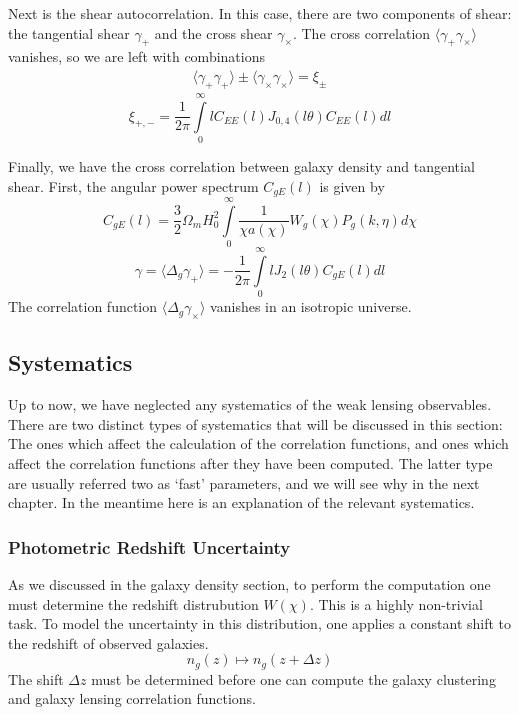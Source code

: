 Next is the shear autocorrelation. In this case, there are two components of shear: the tangential shear $\gamma_+$ and the cross shear $\gamma_\times$. The cross correlation $\langle \gamma_+ \gamma_\times \rangle$ vanishes, so we are left with combinations
\begin{equation}
	\begin{split}
		\langle \gamma_+\gamma_+ \rangle \pm \langle \gamma_\times \gamma_\times \rangle = \xi_\pm
	\end{split}
\end{equation}
\begin{equation}
	\xi_{+,-} = \frac{1}{2\pi}\int\limits_0^\infty l C_{EE}(l) J_{0,4}(l\theta)C_{EE}(l)dl
\end{equation}

Finally, we have the cross correlation between galaxy density and tangential shear. First, the angular power spectrum $C_{gE}(l)$ is given by
\begin{equation}
	C_{gE}(l) = \frac{3}{2}\Omega_mH_0^2 \int\limits_0^\infty \frac{1}{\chi a(\chi)}W_g(\chi)P_g(k,\eta) d\chi
\end{equation}
\begin{equation}
	\gamma = \langle \Delta_g\gamma_+\rangle = -\frac{1}{2\pi}\int\limits_0^\infty l J_2(l\theta)C_{gE}(l)dl
\end{equation}
The correlation function $\langle \Delta_g\gamma_\times\rangle$ vanishes in an isotropic universe.

\subsection{Systematics}
Up to now, we have neglected any systematics of the weak lensing observables. There are two distinct types of systematics that will be discussed in this section: The ones which affect the calculation of the correlation functions, and ones which affect the correlation functions after they have been computed. The latter type are usually referred two as `fast' parameters, and we will see why in the next chapter. In the meantime here is an explanation of the relevant systematics.
\subsubsection{Photometric Redshift Uncertainty}
As we discussed in the galaxy density section, to perform the computation one must determine the redshift distrubution $W(\chi)$. This is a highly non-trivial task. To model the uncertainty in this distribution, one applies a constant shift to the redshift of observed galaxies.
\begin{equation}
	n_g(z) \mapsto n_g(z+\Delta z)
\end{equation}
The shift $\Delta z$ must be determined before one can compute the galaxy clustering and galaxy lensing correlation functions.

